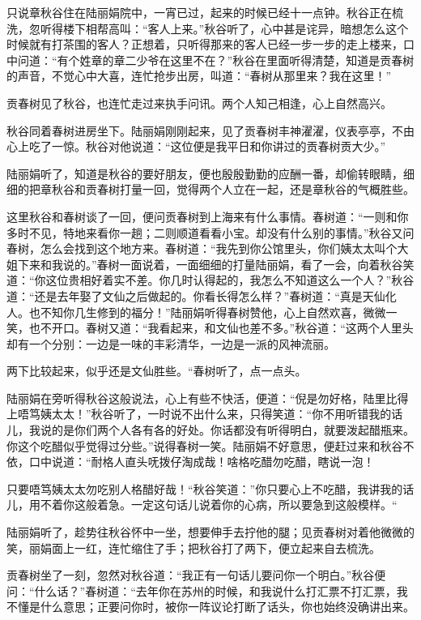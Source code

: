 \documentclass[12pt,UTF8]{ctexbook}
\begin{document}
{{{只说章秋谷住在陆丽娟院中，一宵已过，起来的时候已经十一点钟。秋谷正在梳洗，忽听得楼下相帮高叫：“客人上来。”秋谷听了，心中甚是诧异，暗想怎么这个时候就有打茶围的客人？正想着，只听得那来的客人已经一步一步的走上楼来，口中问道：“有个姓章的章二少爷在这里不在？”秋谷在里面听得清楚，知道是贡春树的声音，不觉心中大喜，连忙抢步出房，叫道：“春树从那里来？我在这里！”

贡春树见了秋谷，也连忙走过来执手问讯。两个人知己相逢，心上自然高兴。

秋谷同着春树进房坐下。陆丽娟刚刚起来，见了贡春树丰神濯濯，仪表亭亭，不由心上吃了一惊。秋谷对他说道：“这位便是我平日和你讲过的贡春树贡大少。”

陆丽娟听了，知道是秋谷的要好朋友，便也殷殷勤勤的应酬一番，却偷转眼睛，细细的把章秋谷和贡春树打量一回，觉得两个人立在一起，还是章秋谷的气概胜些。

这里秋谷和春树谈了一回，便问贡春树到上海来有什么事情。春树道：“一则和你多时不见，特地来看你一趟；二则顺道看看小宝。却没有什么别的事情。”秋谷又问春树，怎么会找到这个地方来。春树道：“我先到你公馆里头，你们姨太太叫个大姐下来和我说的。”春树一面说着，一面细细的打量陆丽娟，看了一会，向着秋谷笑道：“你这位贵相好着实不差。你几时认得起的，我怎么不知道这么一个人？”秋谷道：“还是去年娶了文仙之后做起的。你看长得怎么样？”春树道：“真是天仙化人。也不知你几生修到的福分！”陆丽娟听得春树赞他，心上自然欢喜，微微一笑，也不开口。春树又道：“我看起来，和文仙也差不多。”秋谷道：“这两个人里头却有一个分别：一边是一味的丰彩清华，一边是一派的风神流丽。

两下比较起来，似乎还是文仙胜些。“春树听了，点一点头。

陆丽娟在旁听得秋谷这般说法，心上有些不快活，便道：“倪是勿好格，陆里比得上唔笃姨太太！”秋谷听了，一时说不出什么来，只得笑道：“你不用听错我的话儿，我说的是你们两个人各有各的好处。你话都没有听得明白，就要泼起醋瓶来。你这个吃醋似乎觉得过分些。”说得春树一笑。陆丽娟不好意思，便赶过来和秋谷不依，口中说道：“耐格人直头呒拨仔淘成哉！啥格吃醋勿吃醋，瞎说一泡！

只要唔笃姨太太勿吃别人格醋好哉！“秋谷笑道：”你只要心上不吃醋，我讲我的话儿，用不着你这般着急。一定这句话儿说着你的心病，所以要急到这般模样。“

陆丽娟听了，趁势往秋谷怀中一坐，想要伸手去拧他的腿；见贡春树对着他微微的笑，丽娟面上一红，连忙缩住了手；把秋谷打了两下，便立起来自去梳洗。

贡春树坐了一刻，忽然对秋谷道：“我正有一句话儿要问你一个明白。”秋谷便问：“什么话？”春树道：“去年你在苏州的时候，和我说什么打汇票不打汇票，我不懂是什么意思；正要问你时，被你一阵议论打断了话头，你也始终没确讲出来。

}}}
\end{document}
